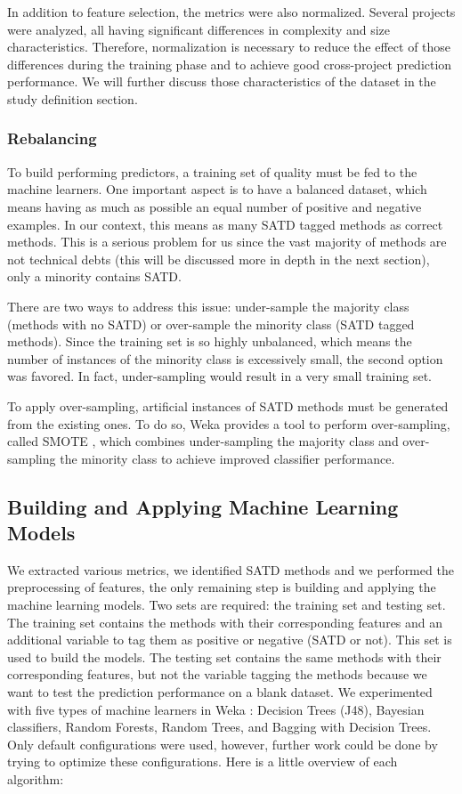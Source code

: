 In addition to feature selection, the metrics were also normalized. Several projects were analyzed, all having significant differences in complexity and size characteristics. Therefore, normalization is necessary to reduce the effect of those differences during the training phase and to achieve good cross-project prediction performance. We will further discuss those characteristics of the dataset in the study definition section.

\subsubsection{Rebalancing}

To build performing predictors, a training set of quality must be fed to the machine learners. One important aspect is to have a balanced dataset, which means having as much as possible an equal number of positive and negative examples. In our context, this means as many \ac{SATD} tagged methods as correct methods. This is a serious problem for us since the vast majority of methods are not technical debts (this will be discussed more in depth in the next section), only a minority contains \ac{SATD}. 

There are two ways to address this issue: under-sample the majority class (methods with no \ac{SATD}) or over-sample the minority class (\ac{SATD} tagged methods). Since the training set is so highly unbalanced, which means the number of instances of the minority class is excessively small, the second option was favored. In fact, under-sampling would result in a very small training set. 

To apply over-sampling, artificial instances of \ac{SATD} methods must be generated from the existing ones. To do so, Weka provides a tool to perform over-sampling, called \ac{SMOTE} \citep{chawla2002smote}, which combines under-sampling the majority class and over-sampling the minority class to achieve improved classifier performance.

\subsection{Building and Applying Machine Learning Models}

 We extracted various metrics, we identified \ac{SATD} methods and we performed the preprocessing of features, the only remaining step is building and applying the machine learning models. Two sets are required: the training set and testing set. The training set contains the methods with their corresponding features and an additional variable to tag them as positive or negative (\ac{SATD} or not). This set is used to build the models. The testing set contains the same methods with their corresponding features, but not the variable tagging the methods because we want to test the prediction performance on a blank dataset. We experimented with five types of machine learners in Weka \citep{hall2009weka}: Decision Trees (J48), Bayesian classifiers, Random Forests, Random Trees, and Bagging with Decision Trees. Only default configurations were used, however, further work could be done by trying to optimize these configurations. Here is a little overview of each algorithm: \par 

